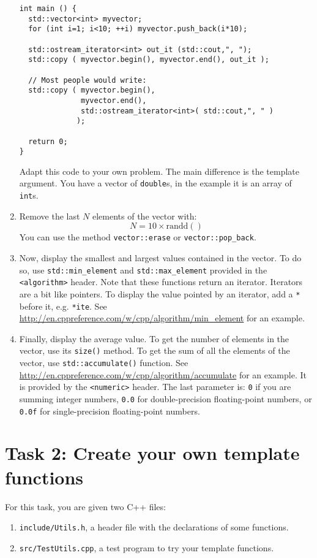 \begin{enumerate}
\begin{lstlisting}
int main () {
  std::vector<int> myvector;
  for (int i=1; i<10; ++i) myvector.push_back(i*10);

  std::ostream_iterator<int> out_it (std::cout,", ");
  std::copy ( myvector.begin(), myvector.end(), out_it );
  
  // Most people would write:
  std::copy ( myvector.begin(), 
              myvector.end(), 
              std::ostream_iterator<int>( std::cout,", " )
             );
 
  return 0;
}
\end{lstlisting}
Adapt this code to your own problem. The main difference is the template argument. 
You have a vector of \verb+double+s, in the example it is an array of \verb+int+s.

\item Remove the last $N$ elements of the vector with:
$$
	N = 10 \times \mathrm{randd()}
$$
You can use the method \verb+vector::erase+ or \verb+vector::pop_back+. 

\item Now, display the smallest and largest values contained in the vector. To do so, use \verb+std::min_element+ and \verb+std::max_element+ provided in the \verb+<algorithm>+ header. Note that these functions return an iterator. Iterators are a bit like pointers. To display the value pointed by an iterator, add a \verb+*+ before it, e.g. \verb+*ite+.
See \url{http://en.cppreference.com/w/cpp/algorithm/min_element} for an example.

\item Finally, display the average value. 
To get the number of elements in the vector, use its \verb+size()+ method. 
To get the sum of all the elements of the vector, use \verb+std::accumulate()+ function. 
See \url{http://en.cppreference.com/w/cpp/algorithm/accumulate} for an example. 
It is provided by the \verb+<numeric>+ header. 
The last parameter is:
\verb+0+ if you are summing integer numbers,
\verb+0.0+ for double-precision floating-point numbers, or 
\verb+0.0f+ for single-precision floating-point numbers.
\end{enumerate}


\section*{Task 2: Create your own template functions}

For this task, you are given two C++ files:
\begin{enumerate}
  \item \verb+include/Utils.h+, a header file with the declarations of some functions.
  \item \verb+src/TestUtils.cpp+, a test program to try your template functions.
\end{enumerate}

